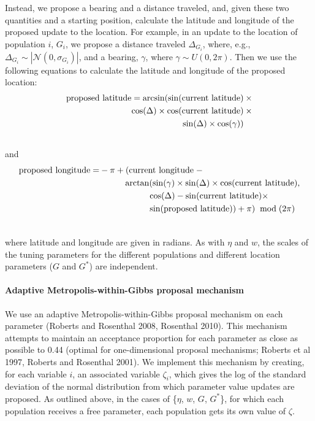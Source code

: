 \documentclass[12pt]{article}
\newcommand{\identifyadmixsource}[1]{{#1^{*}}}
\begin{document}
Instead, we propose a bearing and a distance traveled, and, given these two quantities and a starting position, calculate the latitude and longitude of the proposed update to the location.  For example, in an update to the location of population $i$, $G_i$, we propose a distance traveled $\Delta_{{G}_i}$, where, e.g., $\Delta_{G_i}  \sim | \mathcal{N}(0,\sigma_{{G}_i})|$, and a bearing, $\gamma$, where $\gamma \sim U(0,2\pi)$.  Then we use the following equations to calculate the latitude and longitude of the proposed location:
\begin{align}
\text{proposed latitude} = \arcsin(\sin(\text{current latitude}) \: &\times\\  \notag
					\cos(\Delta) \times \cos(\text{current latitude}) \:&\times\\  \notag
					\sin(\Delta) \times \cos(\gamma))   \:&\phantom{\times}\\  \notag
\end{align}
and
\begin{align}
\text{proposed longitude} = & - \pi + (\text{current longitude} \; - \\ \notag
					 	&\hspace{1cm} \arctan(
							\sin(\gamma) \times
							\sin(\Delta) \times
							\cos(\text{current latitude}) , \\ \notag
						& \hspace{2cm} \cos(\Delta) - 
							\sin(\text{current latitude}) \times \\ \notag
						& \hspace{2cm} \sin(\text{proposed latitude})) + \pi) \; \bmod (2\pi) \\ \notag
\end{align}

where latitude and longitude are given in radians.  As with $\eta$ and $w$, the scales of the tuning parameters for the different populations and different location parameters ($G$ and $\identifyadmixsource{G}$) are independent.


\paragraph{Adaptive Metropolis-within-Gibbs proposal mechanism}
We use an adaptive Metropolis-within-Gibbs proposal mechanism on each parameter (Roberts and Rosenthal 2008, Rosenthal 2010).  This mechanism attempts to maintain an acceptance proportion for each parameter as close as possible to 0.44 (optimal for one-dimensional proposal mechanisms; Roberts et al 1997, Roberts and Rosenthal 2001).  We implement this mechanism by creating, for each variable $i$, an associated variable $\zeta_i$, which gives the log of the standard deviation of the normal distribution from which parameter value updates are proposed.  As outlined above, in the cases of \{$\eta$, $w$, $G$, $\identifyadmixsource{G}$\}, for which each population receives a free parameter, each population gets its own value of $\zeta$.  
\end{document}

